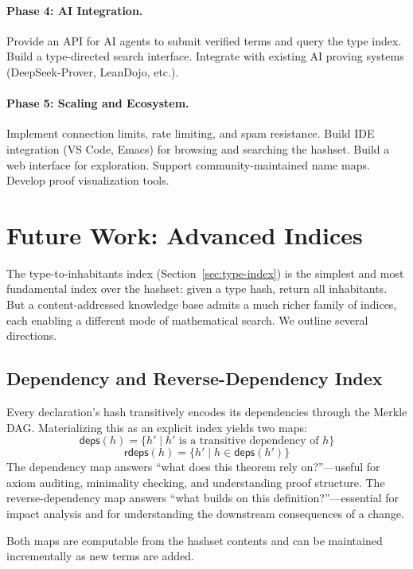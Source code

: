 \documentclass[11pt]{article}
\theoremstyle{definition}
\theoremstyle{plain}
\theoremstyle{remark}
\begin{document}
\paragraph{Phase 4: AI Integration.}
Provide an API for AI agents to submit verified terms and query the type index.
Build a type-directed search interface.
Integrate with existing AI proving systems (DeepSeek-Prover, LeanDojo, etc.).

\paragraph{Phase 5: Scaling and Ecosystem.}
Implement connection limits, rate limiting, and spam resistance.
Build IDE integration (VS Code, Emacs) for browsing and searching the hashset.
Build a web interface for exploration.
Support community-maintained name maps.
Develop proof visualization tools.


\section{Future Work: Advanced Indices}
\label{sec:indices}

The type-to-inhabitants index (Section~\ref{sec:type-index}) is the simplest
and most fundamental index over the hashset: given a type hash, return all inhabitants.
But a content-addressed knowledge base admits a much richer family of indices, each
enabling a different mode of mathematical search.
We outline several directions.

\subsection{Dependency and Reverse-Dependency Index}
\label{sec:dep-index}

Every declaration's hash transitively encodes its dependencies through the Merkle DAG.
Materializing this as an explicit index yields two maps:
\[
  \textsf{deps}(h) = \{ h' \mid h' \text{ is a transitive dependency of } h \}
\]
\[
  \textsf{rdeps}(h) = \{ h' \mid h \in \textsf{deps}(h') \}
\]
The dependency map answers ``what does this theorem rely on?''---useful for
axiom auditing, minimality checking, and understanding proof structure.
The reverse-dependency map answers ``what builds on this definition?''---essential
for impact analysis and for understanding the downstream consequences of a change.

Both maps are computable from the hashset contents and can be maintained incrementally
as new terms are added.
\end{document}
